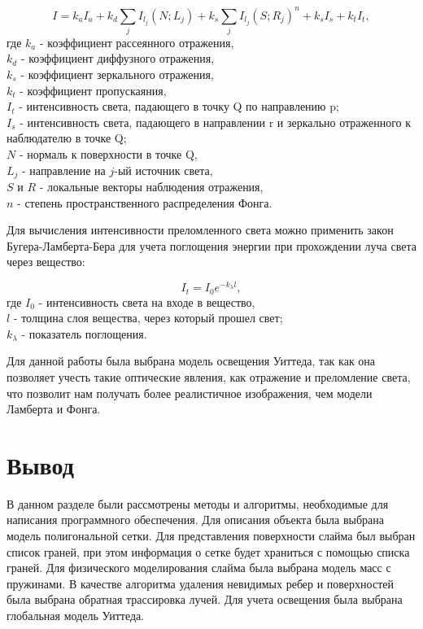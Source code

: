 \begin{equation}\label{whitted_eq}
	I = k_a I_a + k_d \sum_{j} I_{l_j} (N; L_j) + k_s \sum_{j} I_{l_j} (S; R_j)^n + k_s I_s + k_t I_t,
\end{equation}
где $k_a$ - коэффициент рассеянного отражения,\\
\text{~~~~~}$k_d$ - коэффициент диффузного отражения,\\
\text{~~~~~}$k_s$ - коэффициент зеркального отражения,\\
\text{~~~~~}$k_t$ - коэффициент пропускаяния,\\
\text{~~~~~}$I_t$ - интенсивность света, падающего в точку Q по направлению p;\\
\text{~~~~~}$I_s$ - интенсивность света, падающего в направлении r и зеркально отраженного к наблюдателю в точке Q;\\
\text{~~~~~}$N$ - нормаль к поверхности в точке Q,\\
\text{~~~~~}$L_j$ - направление на $j$-ый источник света,\\
\text{~~~~~}$S$ и $R$ - локальные векторы наблюдения отражения,\\
\text{~~~~~}$n$ - степень пространственного распределения Фонга.

Для вычисления интенсивности преломленного света можно применить
закон Бугера-Ламберта-Бера для учета поглощения энергии при прохождении луча
света через вещество:

\begin{equation}\label{blb}
	I_t = I_0 e^{-k_{\lambda} l},
\end{equation}
где $I_0$ - интенсивность света на входе в вещество,\\
\text{~~~~~}$l$ - толщина слоя вещества, через который прошел свет;\\
\text{~~~~~}$k_{\lambda}$ - показатель поглощения.

Для данной работы была выбрана модель освещения Уиттеда, так как она
позволяет учесть такие оптические явления, как отражение и преломление света,
что позволит нам получать более реалистичное изображения, чем модели
Ламберта и Фонга.

\section*{Вывод}

В данном разделе были рассмотрены методы и алгоритмы, необходимые для написания программного обеспечения. Для описания объекта была выбрана модель полигональной сетки. Для представления поверхности слайма был выбран список граней, при этом информация о сетке будет храниться с помощью списка граней. Для физического моделирования слайма была выбрана модель масс с пружинами. В качестве алгоритма удаления невидимых ребер и поверхностей была выбрана обратная трассировка лучей. Для учета освещения была выбрана глобальная модель Уиттеда.

\clearpage
